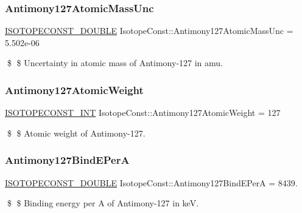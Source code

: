 \subsubsection{\texorpdfstring{Antimony127\+Atomic\+Mass\+Unc}{Antimony127AtomicMassUnc}}
{\footnotesize\ttfamily \mbox{\hyperlink{group___isotope_const-_macros_ga8f45a7272ce02c0b4c65c44636ed719a}{I\+S\+O\+T\+O\+P\+E\+C\+O\+N\+S\+T\+\_\+\+D\+O\+U\+B\+LE}} Isotope\+Const\+::\+Antimony127\+Atomic\+Mass\+Unc = 5.\+502e-\/06}

\$ \$ Uncertainty in atomic mass of Antimony-\/127 in amu. \mbox{\label{group___isotope_const-_antimony-_sb127_gaf093b7ed2338ee4a404bff063b7382b4}} 
\subsubsection{\texorpdfstring{Antimony127\+Atomic\+Weight}{Antimony127AtomicWeight}}
{\footnotesize\ttfamily \mbox{\hyperlink{group___isotope_const-_macros_ga5f18360b3e99483a35c32d789e62621c}{I\+S\+O\+T\+O\+P\+E\+C\+O\+N\+S\+T\+\_\+\+I\+NT}} Isotope\+Const\+::\+Antimony127\+Atomic\+Weight = 127}

\$ \$ Atomic weight of Antimony-\/127. \mbox{\label{group___isotope_const-_antimony-_sb127_ga0d714d314964aebd02fa2fb4ca6f49a0}} 
\subsubsection{\texorpdfstring{Antimony127\+Bind\+E\+PerA}{Antimony127BindEPerA}}
{\footnotesize\ttfamily \mbox{\hyperlink{group___isotope_const-_macros_ga8f45a7272ce02c0b4c65c44636ed719a}{I\+S\+O\+T\+O\+P\+E\+C\+O\+N\+S\+T\+\_\+\+D\+O\+U\+B\+LE}} Isotope\+Const\+::\+Antimony127\+Bind\+E\+PerA = 8439.}

\$ \$ Binding energy per A of Antimony-\/127 in keV. \mbox{\label{group___isotope_const-_antimony-_sb127_ga0ac64116de4815954961a48411072939}} 

